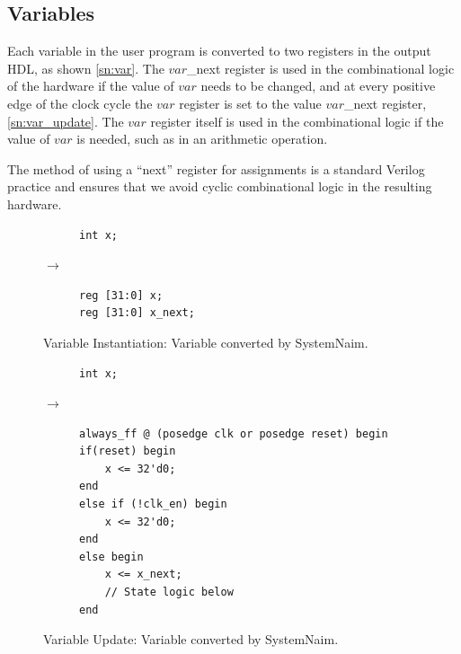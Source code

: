 \subsection{Variables}
\label{sn:var_sections}

Each variable in the user program is converted to two registers in the output HDL, as shown \autoref{sn:var}. The $var$\_next register is used in the combinational logic of the hardware if the value of $var$ needs to be changed, and at every positive edge of the clock cycle the $var$ register is set to the value $var$\_next register, \autoref{sn:var_update}. The $var$ register itself is used in the combinational logic if the value of $var$ is needed, such as in an arithmetic operation.

The method of using a “next” register for assignments is a standard Verilog practice and ensures that we avoid cyclic combinational logic in the resulting hardware. 

\begin{figure}[H]
\centering
\begin{subfigure}{0.15\textwidth}
    \centering
    \begin{verbatim}
int x;
    \end{verbatim}
\end{subfigure}%
{\LARGE$\rightarrow$}%
\begin{subfigure}{0.25\textwidth}
    \begin{verbatim}
reg [31:0] x;
reg [31:0] x_next;
    \end{verbatim}
\end{subfigure}
\caption{Variable Instantiation: Variable converted by SystemNaim.}
\label{sn:var}
\end{figure}

\begin{figure}[H]
\centering
\begin{subfigure}{0.15\textwidth}
    \centering
    \begin{verbatim}
int x;
    \end{verbatim}
\end{subfigure}%
{\LARGE$\rightarrow$}%
\begin{subfigure}{0.45\textwidth}
    \begin{verbatim}
always_ff @ (posedge clk or posedge reset) begin
if(reset) begin
    x <= 32'd0;
end
else if (!clk_en) begin
    x <= 32'd0;
end
else begin
    x <= x_next;
    // State logic below
end
    \end{verbatim}
\end{subfigure}
\caption{Variable Update: Variable converted by SystemNaim.}
\label{sn:var_update}
\end{figure}

